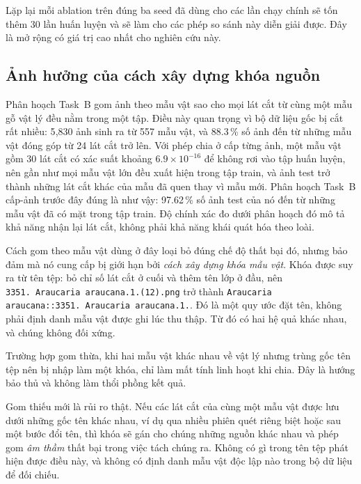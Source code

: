 Lặp lại mỗi ablation trên đúng ba seed đã dùng cho các lần chạy chính sẽ tốn
thêm 30 lần huấn luyện và sẽ làm cho các phép so sánh này diễn giải được. Đây
là mở rộng có giá trị cao nhất cho nghiên cứu này.

\subsection{Ảnh hưởng của cách xây dựng khóa nguồn}
\label{vi:sec:discussion:originkey}

Phân hoạch Task~B gom ảnh theo mẫu vật sao cho mọi lát cắt từ cùng một mẫu gỗ
vật lý đều nằm trong một tập. Điều này quan trọng vì bộ dữ liệu gốc bị cắt rất
nhiều: 5{,}830 ảnh sinh ra từ 557 mẫu vật, và 88.3\,\% số ảnh đến từ những mẫu
vật đóng góp từ 24 lát cắt trở lên. Với phép chia ở cấp từng ảnh, một mẫu vật
gồm 30 lát cắt có xác suất khoảng $6.9\times10^{-16}$ để không rơi vào tập
huấn luyện, nên gần như mọi mẫu vật lớn đều xuất hiện trong tập train, và ảnh
test trở thành những lát cắt khác của mẫu đã quen thay vì mẫu mới. Phân hoạch
Task~B cấp-ảnh trước đây đúng là như vậy: 97.62\,\% số ảnh test của nó đến từ
những mẫu vật đã có mặt trong tập train. Độ chính xác đo dưới phân hoạch đó mô
tả khả năng nhận lại lát cắt, không phải khả năng khái quát hóa theo loài.

Cách gom theo mẫu vật dùng ở đây loại bỏ đúng chế độ thất bại đó, nhưng bảo đảm
mà nó cung cấp bị giới hạn bởi \emph{cách xây dựng khóa mẫu vật}. Khóa được suy
ra từ tên tệp: bỏ chỉ số lát cắt ở cuối và thêm tên lớp ở đầu, nên
\texttt{3351.\ Araucaria araucana.1.(12).png} trở thành
\texttt{Araucaria araucana::3351.\ Araucaria araucana.1.}. Đó là một quy ước
đặt tên, không phải định danh mẫu vật được ghi lúc thu thập. Từ đó có hai hệ
quả khác nhau, và chúng không đối xứng.

Trường hợp gom thừa, khi hai mẫu vật khác nhau về vật lý nhưng trùng gốc tên tệp nên bị
nhập làm một khóa, chỉ làm mất tính linh hoạt khi chia. Đây là hướng bảo thủ
và không làm thổi phồng kết quả.

Gom thiếu mới là rủi ro thật. Nếu các lát cắt của cùng một mẫu vật được lưu
dưới những gốc tên khác nhau, ví dụ qua nhiều phiên quét riêng biệt hoặc sau
một bước đổi tên, thì khóa sẽ gán cho chúng những nguồn khác nhau và phép gom
\emph{âm thầm} thất bại trong việc tách chúng ra. Không có gì trong tên tệp
phát hiện được điều này, và không có định danh mẫu vật độc lập nào trong bộ dữ
liệu để đối chiếu.

